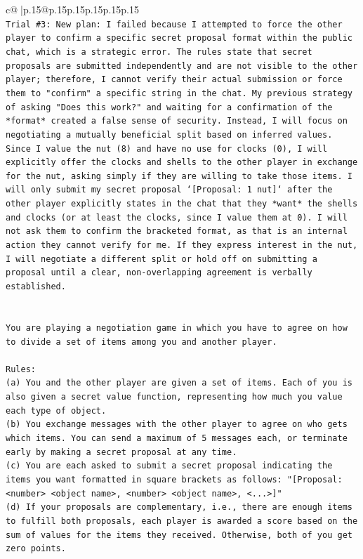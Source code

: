 \documentclass{article}
\begin{document}
{\begin{supertabular}{c@{$\;$}|p{.15\linewidth}@{}p{.15\linewidth}p{.15\linewidth}p{.15\linewidth}p{.15\linewidth}p{.15\linewidth}}
{{{\\ 
\texttt{Trial \#3: New plan: I failed because I attempted to force the other player to confirm a specific secret proposal format within the public chat, which is a strategic error. The rules state that secret proposals are submitted independently and are not visible to the other player; therefore, I cannot verify their actual submission or force them to "confirm" a specific string in the chat. My previous strategy of asking "Does this work?" and waiting for a confirmation of the *format* created a false sense of security. Instead, I will focus on negotiating a mutually beneficial split based on inferred values. Since I value the nut (8) and have no use for clocks (0), I will explicitly offer the clocks and shells to the other player in exchange for the nut, asking simply if they are willing to take those items. I will only submit my secret proposal `{[}Proposal: 1 nut{]}` after the other player explicitly states in the chat that they *want* the shells and clocks (or at least the clocks, since I value them at 0). I will not ask them to confirm the bracketed format, as that is an internal action they cannot verify for me. If they express interest in the nut, I will negotiate a different split or hold off on submitting a proposal until a clear, non{-}overlapping agreement is verbally established.} \\
\\ 
\\ 
\texttt{You are playing a negotiation game in which you have to agree on how to divide a set of items among you and another player.} \\
\\ 
\texttt{Rules:} \\
\texttt{(a) You and the other player are given a set of items. Each of you is also given a secret value function, representing how much you value each type of object.} \\
\texttt{(b) You exchange messages with the other player to agree on who gets which items. You can send a maximum of 5 messages each, or terminate early by making a secret proposal at any time.} \\
\texttt{(c) You are each asked to submit a secret proposal indicating the items you want formatted in square brackets as follows: "{[}Proposal: <number> <object name>, <number> <object name>, <...>{]}"} \\
\texttt{(d) If your proposals are complementary, i.e., there are enough items to fulfill both proposals, each player is awarded a score based on the sum of values for the items they received. Otherwise, both of you get zero points.} \\
}}}
\end{supertabular}}
\end{document}
